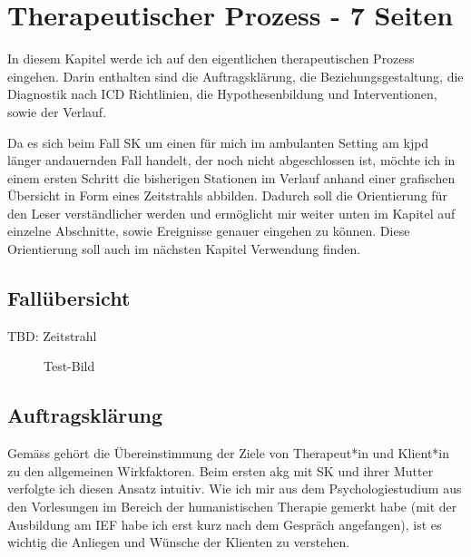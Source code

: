 \section{Therapeutischer Prozess - 7 Seiten}\label{Prozess}
In diesem Kapitel werde ich auf den eigentlichen therapeutischen Prozess eingehen. Darin enthalten sind die Auftragsklärung, die Beziehungsgestaltung, die Diagnostik nach ICD Richtlinien, die Hypothesenbildung und Interventionen, sowie der Verlauf.   

Da es sich beim Fall SK um einen für mich im ambulanten Setting am \ac{kjpd} länger andauernden Fall handelt, der noch nicht abgeschlossen ist, möchte ich in einem ersten Schritt die bisherigen Stationen im Verlauf anhand einer grafischen Übersicht in Form eines Zeitstrahls abbilden. Dadurch soll die Orientierung für den Leser verständlicher werden und ermöglicht mir weiter unten im Kapitel  auf einzelne Abschnitte, sowie Ereignisse genauer eingehen zu können. Diese Orientierung soll auch im nächsten Kapitel  Verwendung finden. 

\subsection{Fallübersicht}\label{lbFallübersicht}
TBD: Zeitstrahl
\begin{figure} 
    \caption{Test-Bild}
\end{figure}

\subsection{Auftragsklärung}\label{Auftragsklärung} 
Gemäss  gehört die Übereinstimmung der Ziele von Therapeut*in und Klient*in zu den allgemeinen Wirkfaktoren. Beim ersten \acf{akg} mit SK und ihrer Mutter verfolgte ich diesen Ansatz intuitiv. Wie ich mir aus dem Psychologiestudium aus den Vorlesungen im Bereich der humanistischen Therapie gemerkt habe (mit der Ausbildung am IEF habe ich erst kurz nach dem Gespräch angefangen), ist es wichtig die Anliegen und Wünsche der Klienten zu verstehen. 


